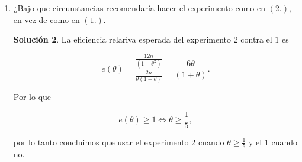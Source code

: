 \documentclass[letterpaper]{article}
\theoremstyle{definition}
\theoremstyle{lemathm}
\theoremstyle{lemathm}
\newtheorem{sol}{Solución}
\theoremstyle{lemathm}
\theoremstyle{lemademthm}
\newcommand{\pars}[1]{\left( #1 \right) }
\newcommand{\1}{\mathbbm{1}}
\begin{document}
\begin{enumerate}
		\begin{sol}

			Notemos que nuestro problema $X$ se distribuye binomial con parametros $3n$, $\theta^2$. Ahora, tenemos que $X\sim Multnom(n,\vec{p})$, por lo que la función de verosimilitud de $\theta$ es

			\[L\pars{\theta} = C\pars{\theta^2}^{x}\pars{1-\theta^2}^{3n-x},\]

			la función de logverosimilitud es

			\[l\pars{\theta} = C + 2x\log\pars{\theta} + \pars{3n- x}\log{1-\theta^2},\]

			la  función score es

			\[S\pars{\theta} = \frac{2x}{\theta} + \frac{2\theta\pars{3n-x}}{1-\theta^2},\]

			y la función de información observada de fisher es

			\[I\pars{\theta} = \frac{2x}{\theta^2} + \frac{2\pars{3n-x}\pars{1+\theta^2}}{\pars{\pars{1-\theta}^2}^2}.\]

			Por último, obtenemos la función de información de fisher

			\[\mathcal{I}\pars{\theta} = \frac{6n\theta^2}{\theta^2} + \frac{2\pars{3n-2n\theta^2}\pars{1+\theta^2}}{\pars{1-\theta}^2} = \frac{12n}{\pars{1-\theta^2}}.\]

		\end{sol}

		\item ¿Bajo que circunstancias recomendaría hacer el experimento como en $(2.)$, en vez de como en $(1.)$.
		
		\begin{sol}
			La eficiencia relariva esperada del experimento $2$ contra el $1$ es

			\[e\pars{\theta} = \frac{\frac{12n}{\pars{1-\theta^2}}}{\frac{2n}{\theta\pars{1-\theta}}} = \frac{6\theta}{\pars{1+\theta}}.\]

			Por lo que

			\[e\pars{\theta} \geq 1 \Leftrightarrow \theta \geq \frac{1}{5},\]

			por lo tanto concluimos que usar el experimento $2$ cuando $\theta\geq\frac{1}{5}$ y el $1$ cuando no.
		\end{sol}
	\end{enumerate}
\end{document}
